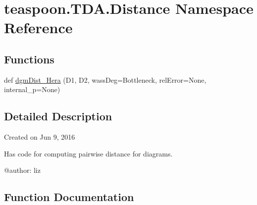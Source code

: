 \hypertarget{namespaceteaspoon_1_1_t_d_a_1_1_distance}{}\section{teaspoon.\+T\+D\+A.\+Distance Namespace Reference}
\label{namespaceteaspoon_1_1_t_d_a_1_1_distance}
\subsection*{Functions}
\begin{DoxyCompactItemize}
\item 
def \hyperlink{namespaceteaspoon_1_1_t_d_a_1_1_distance_ad3481b3888962dbf302bacb9d9504e8b}{dgm\+Dist\+\_\+\+Hera} (D1, D2, wass\+Deg=\textquotesingle{}Bottleneck\textquotesingle{}, rel\+Error=None, internal\+\_\+p=None)
\end{DoxyCompactItemize}


\subsection{Detailed Description}
\begin{DoxyVerb}Created on Jun 9, 2016

Has code for computing pairwise distance for diagrams.

@author: liz
\end{DoxyVerb}
 

\subsection{Function Documentation}
